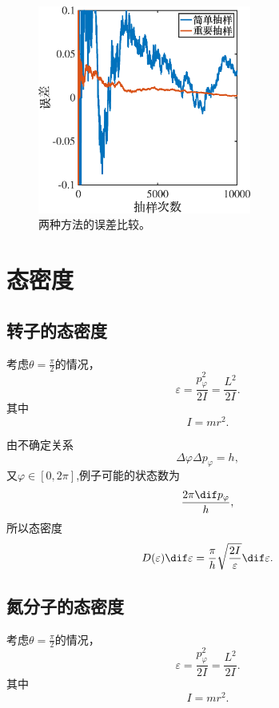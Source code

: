 \documentclass[12pt]{article}
\begin{document}
\begin{figure}[htp]
	\centering
	\includegraphics[width=7cm]{5.eps}
	\caption{两种方法的误差比较。}
	\label{fig:5}
\end{figure}

\section{态密度}

\subsection{转子的态密度}

考虑$\theta = \frac{\pi}{2}$的情况，
\begin{equation}
	\varepsilon = \frac{p^2_\varphi}{2I} = \frac{L^2}{2I}.
\end{equation}
其中
\begin{equation}
	I = m r^2.
\end{equation}

由不确定关系
\begin{equation}
	\Delta \varphi \Delta p_\varphi = h,
\end{equation}
又$\varphi\in [0,2\pi]$,例子可能的状态数为
\begin{equation}
	\frac{2\pi \dif p_\varphi}{h},
\end{equation}
所以态密度
\begin{equation}
	D(\varepsilon) \dif \varepsilon = \frac{\pi}{h} \sqrt{\frac{2I}{\varepsilon}}\dif \varepsilon.
\end{equation}


\subsection{氮分子的态密度}

考虑$\theta = \frac{\pi}{2}$的情况，
\begin{equation}
	\varepsilon = \frac{p^2_\varphi}{2I} = \frac{L^2}{2I}.
\end{equation}
其中
\begin{equation}
	I = m r^2.
\end{equation}
\end{document}
